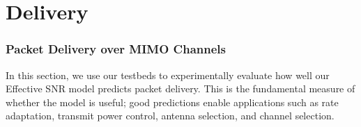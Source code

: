 \ifx\mainfile\undefined

\setcounter{chapter}{5} %
\fi

\cleardoublepage
\chapter{Delivery}
\label{chap:delivery}

\subsection{Packet Delivery over MIMO Channels}
In this section, we use our testbeds to experimentally evaluate how well our Effective SNR model predicts packet delivery. This is the fundamental measure of whether the model is useful; good predictions enable applications such as rate adaptation, transmit power control, antenna selection, and channel selection.

